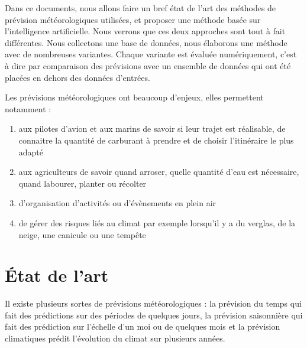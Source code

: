\documentclass[11pt,a4paper]{article}
\begin{document}
Dans ce documents, nous allons faire un bref état de l'art des méthodes de prévision météorologiques utilisées, et proposer une méthode basée sur l'intelligence artificielle. Nous verrons que ces deux approches sont tout à fait différentes. Nous collectons une base de données, nous élaborons une méthode avec de nombreuses variantes. Chaque variante est évaluée numériquement, c'est à dire par comparaison des prévisions avec un ensemble de données qui ont été placées en dehors des données d'entrées.

 \vspace {0.6cm}
Les prévisions météorologiques ont beaucoup d'enjeux, elles permettent notamment :
\begin {enumerate}
\item aux pilotes d'avion et aux marins de savoir si leur trajet est réalisable, de connaitre la quantité de carburant à prendre et de choisir l'itinéraire le plus adapté
\item aux agriculteurs de savoir quand arroser, quelle quantité d'eau est nécessaire, quand labourer, planter ou récolter 
\item d'organisation d'activités ou d'évènements en plein air
\item de gérer des risques liés au climat par exemple lorsqu'il y a du verglas, de la neige, une canicule ou une tempête
\end{enumerate}

 
\section{État de l'art}

Il existe plusieurs sortes de prévisions météorologiques : la prévision du temps qui fait des prédictions sur des périodes de quelques jours, la prévision saisonnière qui fait des prédiction sur l'échelle d'un moi ou de quelques mois et la prévision climatiques prédit l'évolution du climat sur plusieurs années.
\end{document}
